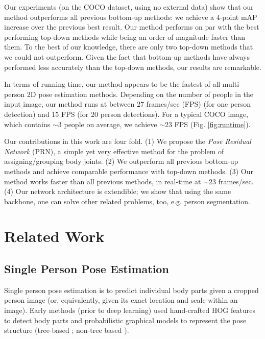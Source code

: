 \documentclass[runningheads]{llncs}
\begin{document}
Our experiments (on the COCO dataset, using no external data) show that our method outperforms all previous bottom-up methods: we achieve a 4-point mAP increase over the previous best result. Our method performs on par with the best performing top-down methods while being an order of magnitude faster than them. To the best of our knowledge, there are only two top-down methods that we could not outperform.  Given the fact that bottom-up methods have always performed less accurately than the top-down methods, our results are remarkable. 


In terms of running time, our method appears to be the fastest of all multi-person 2D pose estimation methods. Depending on the number of people in the input image, our method runs at between $27$ frames/sec (FPS) (for one person detection) and $15$ FPS (for $20$ person detections). For a typical COCO image, which contains $\sim$3 people on average, we achieve $\sim$23 FPS (Fig. \ref{fig:runtime}). 


Our contributions in this work are four fold. (1) We propose the \textit{Pose Residual Network} (PRN), a simple yet very effective method for the problem of assigning/grouping body joints. (2) We outperform all previous bottom-up methods and achieve comparable performance with top-down methods. (3) Our method works faster than all previous methods, in real-time at $\sim$23 frames/sec. (4) Our network architecture is extendible; we show that using the same backbone, one can solve other related problems, too, e.g. person segmentation.
 
\section{Related Work}
\subsection{Single Person Pose Estimation}
Single person pose estimation is to predict individual body parts given  a cropped person image (or, equivalently, given its exact location and scale within an image). Early methods (prior to deep learning) used hand-crafted HOG features \cite{Dalal2005} to detect body parts and probabilistic graphical models to represent the pose structure (tree-based  \cite{Pishchulin2013,Yang2011,Johnson,Andriluka2009}; non-tree based \cite{Dantone2013,Gkioxari2014}). 
\end{document}
